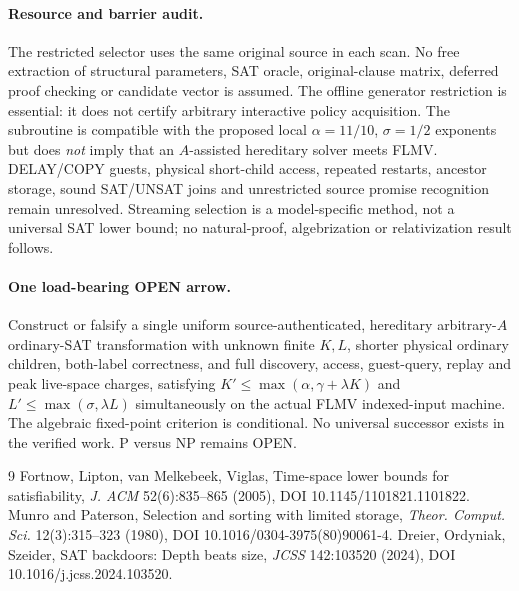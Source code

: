 \documentclass[11pt]{article}
\begin{document}
\paragraph{Resource and barrier audit.}
The restricted selector uses the same original source in each scan. No free extraction of structural parameters, SAT oracle, original-clause matrix, deferred proof checking or candidate vector is assumed. The offline generator restriction is essential: it does not certify arbitrary interactive policy acquisition. The subroutine is compatible with the proposed local $\alpha=11/10$, $\sigma=1/2$ exponents but does \emph{not} imply that an $A$-assisted hereditary solver meets FLMV. DELAY/COPY guests, physical short-child access, repeated restarts, ancestor storage, sound SAT/UNSAT joins and unrestricted source promise recognition remain unresolved. Streaming selection is a model-specific method, not a universal SAT lower bound; no natural-proof, algebrization or relativization result follows.

\paragraph{One load-bearing OPEN arrow.}
Construct or falsify a single uniform source-authenticated, hereditary arbitrary-$A$ ordinary-SAT transformation with unknown finite $K,L$, shorter physical ordinary children, both-label correctness, and full discovery, access, guest-query, replay and peak live-space charges, satisfying $K'\le\max(\alpha,\gamma+\lambda K)$ and $L'\le\max(\sigma,\lambda L)$ simultaneously on the actual FLMV indexed-input machine. The algebraic fixed-point criterion is conditional. No universal successor exists in the verified work. P versus NP remains OPEN.

\begin{thebibliography}{9}
 Fortnow, Lipton, van Melkebeek, Viglas, Time-space lower bounds for satisfiability, \emph{J. ACM} 52(6):835--865 (2005), DOI 10.1145/1101821.1101822.
 Munro and Paterson, Selection and sorting with limited storage, \emph{Theor. Comput. Sci.} 12(3):315--323 (1980), DOI 10.1016/0304-3975(80)90061-4.
 Dreier, Ordyniak, Szeider, SAT backdoors: Depth beats size, \emph{JCSS} 142:103520 (2024), DOI 10.1016/j.jcss.2024.103520.
\end{thebibliography}
\end{document}
